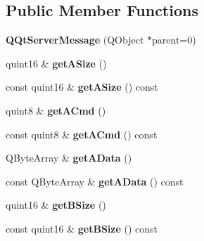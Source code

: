 \subsection*{Public Member Functions}
\begin{DoxyCompactItemize}
\item 
\mbox{\label{class_q_qt_server_message_a78236646d0049e6637e6ff9b2b47a9d2}} 
{\bfseries Q\+Qt\+Server\+Message} (Q\+Object $\ast$parent=0)
\item 
\mbox{\label{class_q_qt_server_message_a880c90eacc385fafcc48a475b706962b}} 
quint16 \& {\bfseries get\+A\+Size} ()
\item 
\mbox{\label{class_q_qt_server_message_a3dd32f97778e592d2f21de66710af622}} 
const quint16 \& {\bfseries get\+A\+Size} () const
\item 
\mbox{\label{class_q_qt_server_message_a7818a2627c26008facbf2f064b9881ad}} 
quint8 \& {\bfseries get\+A\+Cmd} ()
\item 
\mbox{\label{class_q_qt_server_message_af1ac0c0a9cae8a381f9a68d7bfb2cf55}} 
const quint8 \& {\bfseries get\+A\+Cmd} () const
\item 
\mbox{\label{class_q_qt_server_message_a48f9dfb5eb732e346e6f256d7ec2b1a8}} 
Q\+Byte\+Array \& {\bfseries get\+A\+Data} ()
\item 
\mbox{\label{class_q_qt_server_message_a0ea46a3fbb3050df8e1b0da7a71a67fc}} 
const Q\+Byte\+Array \& {\bfseries get\+A\+Data} () const
\item 
\mbox{\label{class_q_qt_server_message_a2c21f1f2ba9385c359b1e530d87bc677}} 
quint16 \& {\bfseries get\+B\+Size} ()
\item 
\mbox{\label{class_q_qt_server_message_a8b272dcb011b079e035720ecce392eb5}} 
const quint16 \& {\bfseries get\+B\+Size} () const
\item 
\mbox{\label{class_q_qt_server_message_a89ec78ff372dc72dd11df0d00fed28da}} 

\end{DoxyCompactItemize}

